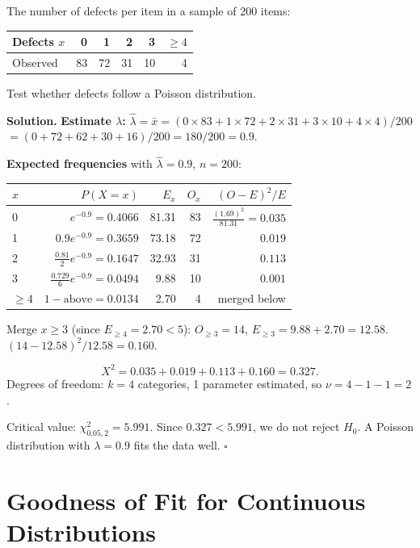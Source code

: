 \documentclass[12pt, a4paper, oneside]{book}
\theoremstyle{definition}
\theoremstyle{plain}
\theoremstyle{remark}
\newenvironment{solution}
  {\par\medskip\noindent\textbf{Solution.}\quad}
  {\hfill$\square$\par\medskip}
\begin{document}
\begin{workedexample}
The number of defects per item in a sample of 200 items:
\begin{center}
\begin{tabular}{lrrrrr}
\toprule
Defects $x$ & 0 & 1 & 2 & 3 & $\ge 4$ \\
\midrule
Observed    & 83 & 72 & 31 & 10 & 4 \\
\bottomrule
\end{tabular}
\end{center}
Test whether defects follow a Poisson distribution.

\begin{solution}
\textbf{Estimate $\lambda$:}
$\hat{\lambda} = \bar{x} = (0\times 83+1\times 72+2\times 31+3\times 10+4\times 4)/200$
$= (0+72+62+30+16)/200 = 180/200 = 0.9$.

\textbf{Expected frequencies} with $\hat{\lambda}=0.9$, $n=200$:
\begin{center}
\begin{tabular}{lrrrr}
\toprule
$x$ & $P(X=x)$ & $E_x$ & $O_x$ & $(O-E)^2/E$ \\
\midrule
0      & $e^{-0.9}=0.4066$         & 81.31 & 83 & $\frac{(1.69)^2}{81.31}=0.035$ \\
1      & $0.9e^{-0.9}=0.3659$      & 73.18 & 72 & $0.019$ \\
2      & $\frac{0.81}{2}e^{-0.9}=0.1647$ & 32.93 & 31 & $0.113$ \\
3      & $\frac{0.729}{6}e^{-0.9}=0.0494$ & 9.88  & 10 & $0.001$ \\
$\ge4$ & $1-\text{above}=0.0134$   & 2.70  & 4  & merged below \\
\bottomrule
\end{tabular}
\end{center}
Merge $x\ge 3$ (since $E_{\ge 4}=2.70 < 5$):
$O_{\ge 3}=14$, $E_{\ge 3}=9.88+2.70=12.58$.
$(14-12.58)^2/12.58 = 0.160$.

\[
  X^2 = 0.035 + 0.019 + 0.113 + 0.160 = 0.327.
\]
Degrees of freedom: $k=4$ categories, 1 parameter estimated, so $\nu=4-1-1=2$.

Critical value: $\chi^2_{0.05,2}=5.991$.  Since $0.327<5.991$, we do not reject $H_0$.
A Poisson distribution with $\lambda=0.9$ fits the data well.
\end{solution}
\end{workedexample}

\section{Goodness of Fit for Continuous Distributions}
\label{sec:gof-cont}
\end{document}

